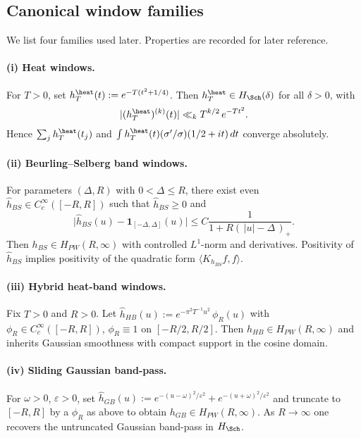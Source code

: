 \subsection{Canonical window families}
\label{subsec:canonical-windows}

We list four families used later. Properties are recorded for later reference.

\paragraph{(i) Heat windows.}
For $T>0$, set $h_T^{\heat}(t):=e^{-T(t^2+1/4)}$. Then $h_T^{\heat}\in H_{\Sch}(\delta)$ for all $\delta>0$, with
\[
  |(h_T^{\heat})^{(k)}(t)| \ll_{k} T^{k/2}\, e^{-Tt^2}.
\]
Hence $\sum_j h_T^{\heat}(t_j)$ and $\int h_T^{\heat}(t)(\sigma'/\sigma)(1/2+it)\,dt$ converge absolutely.

\paragraph{(ii) Beurling–Selberg band windows.}
For parameters $(\Delta,R)$ with $0<\Delta\le R$, there exist even $\widehat h_{BS}\in C_c^\infty([-R,R])$ such that $\widehat h_{BS}\ge0$ and
\[
  \Big|\widehat h_{BS}(u) - \mathbf 1_{[-\Delta,\Delta]}(u)\Big| \le C\frac{1}{1+R(\,|u|-\Delta\,)_+}.
\]
Then $h_{BS}\in H_{PW}(R,\infty)$ with controlled $L^1$-norm and derivatives. Positivity of $\widehat h_{BS}$ implies positivity of the quadratic form $\langle K_{h_{BS}}f,f\rangle$.

\paragraph{(iii) Hybrid heat-band windows.}
Fix $T>0$ and $R>0$. Let $\widehat h_{HB}(u):=e^{-\pi^2 T^{-1} u^2}\,\phi_R(u)$ with $\phi_R\in C_c^\infty([-R,R])$, $\phi_R\equiv 1$ on $[-R/2,R/2]$. Then $h_{HB}\in H_{PW}(R,\infty)$ and inherits Gaussian smoothness with compact support in the cosine domain.

\paragraph{(iv) Sliding Gaussian band-pass.}
For $\omega>0$, $\varepsilon>0$, set $\widehat h_{GB}(u):=e^{-(u-\omega)^2/\varepsilon^2}+e^{-(u+\omega)^2/\varepsilon^2}$ and truncate to $[-R,R]$ by a $\phi_R$ as above to obtain $h_{GB}\in H_{PW}(R,\infty)$. As $R\to\infty$ one recovers the untruncated Gaussian band-pass in $H_{\Sch}$.

